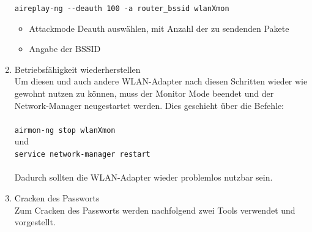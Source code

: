 \begin{enumerate}
	\colorbox{altgray}{\lstinline|aireplay-ng --deauth 100 -a router_bssid wlanXmon|}
	\begin{itemize}
		\item {} Attackmode Deauth auswählen, mit Anzahl der zu sendenden Pakete
		\item {} Angabe der BSSID
	\end{itemize}
	
	\item Betriebsfähigkeit wiederherstellen \\

	Um diesen und auch andere WLAN-Adapter nach diesen Schritten wieder wie gewohnt nutzen zu können, muss der Monitor Mode beendet und der Network-Manager neugestartet werden. Dies geschieht über die Befehle:\\
	\\
	\colorbox{altgray}{\lstinline|airmon-ng stop wlanXmon|}\\
	und\\
	\colorbox{altgray}{\lstinline|service network-manager restart|}\\
	\\
	Dadurch sollten die WLAN-Adapter wieder problemlos nutzbar sein.

	\item Cracken des Passworts \\
	Zum Cracken des Passworts werden nachfolgend zwei Tools verwendet und vorgestellt.
	\end{enumerate}
	
	


